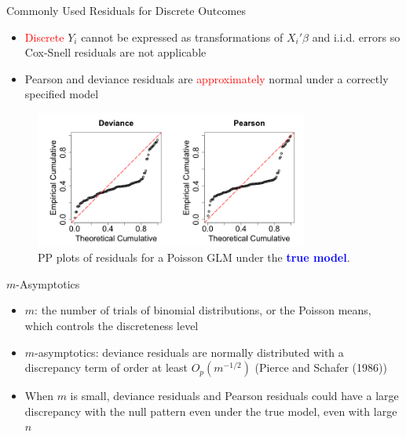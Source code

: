 \documentclass[
  ignorenonframetext,
]{beamer}
\providecommand{\tightlist}{%
  \setlength{\itemsep}{0pt}\setlength{\parskip}{0pt}}
\begin{document}
\begin{frame}{Commonly Used Residuals for Discrete Outcomes}
\protect\hypertarget{commonly-used-residuals-for-discrete-outcomes}{}
\begin{itemize}
\item  \textcolor{red}{Discrete} $Y_i$ cannot be expressed as transformations of $X_i'\beta$  and i.i.d. errors so Cox-Snell residuals are not applicable

    \item Pearson and deviance residuals are \textcolor{red}{approximately} normal under a correctly specified model
\end{itemize}

\vspace{5pt}
\begin{figure}[h]
\includegraphics[width=0.8\textwidth]{figures/poisson2coefslides2}
\caption{PP plots of residuals for a Poisson GLM  under the \textcolor{blue}{\textbf{true model}}.}
\end{figure}
\end{frame}

\begin{frame}{\(m\)-Asymptotics}
\protect\hypertarget{m-asymptotics}{}
\begin{itemize}
\tightlist
\item
  \(m\): the number of trials of binomial distributions, or the Poisson
  means, which controls the discreteness level \vspace{0.2in}
\item
  \(m\)-asymptotics: deviance residuals are normally distributed with a
  discrepancy term of order at least \(O_p(m^{-1/2})\) (Pierce and
  Schafer (1986)) \vspace{0.2in}
\item
  When \(m\) is small, deviance residuals and Pearson residuals could
  have a large discrepancy with the null pattern even under the true
  model, even with large \(n\)
\end{itemize}
\end{frame}
\end{document}
